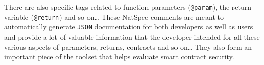 There are also specific tags related to function parameters
(\texttt{@param}), the return variable (\texttt{@return}) and so
on\ldots{} These NatSpec comments are meant to automatically generate
\texttt{JSON} documentation for both developers as well as users and
provide a lot of valuable information that the developer intended for
all these various aspects of parameters, returns, contracts and so
on\ldots{} They also form an important piece of the toolset that helps
evaluate smart contract security.
